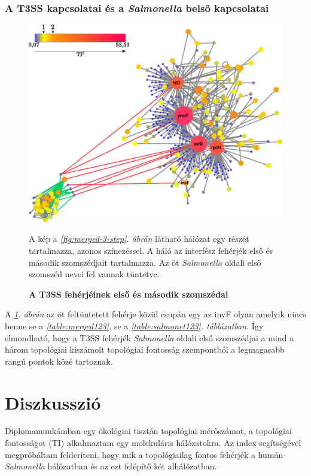 \documentclass[a4paper,12pt]{article}
\newenvironment{imgdesc}{
		\small
		\singlespacing
		\begin{center}
		
	}{
		\end{center}	
	}
\begin{document}
		\subsubsection{A T3SS kapcsolatai és a \textit{Salmonella} belső kapcsolatai}
		
		\begin{figure}[H]
			\includegraphics[scale=0.6]{img/t3ss-inner-salmonella.pdf}
			\centering
			\caption{ \textbf{A T3SS fehérjéinek első és második szomszédai}}
			\begin{imgdesc}
				A kép a \textit{\ref{fig:merged-3-step}. ábrán} látható hálózat egy részét tartalmazza, azonos színezéssel. A háló az interfész fehérjék első és második szomszédjait tartalmazza. Az öt \textit{Salmonella} oldali első szomszéd nevei fel vannak tüntetve.
			\end{imgdesc}
			\label{fig:t3ss_inner}			 		 
		\end{figure}

		A \textit{\ref{fig:t3ss_inner}. ábrán} az öt feltüntetett fehérje közül csupán egy az invF olyan amelyik nincs benne se a \textit{\ref{table:merged123}.} se a \textit{\ref{table:salmonet123}. táblázatban}. Így elmondható, hogy a T3SS fehérjék \textit{Salmonella} oldali első szomszédjai a mind a három topológiai kiszámolt topológiai fontosság szempontból a legmagasabb rangú pontok közé tartoznak.

		\pagebreak
	
\section{Diszkusszió}
		Diplomamunkámban egy ökológiai tisztán topológiai mérőszámot, a topológiai fontosságot (TI) alkalmaztam egy molekuláris hálózatokra. Az index segítségével megpróbáltam felderíteni, hogy mik a topológiailag fontos fehérjék a humán-\textit{Salmonella} hálózatban és az ezt felépítő két alhálózatban. 
		
\end{document}

